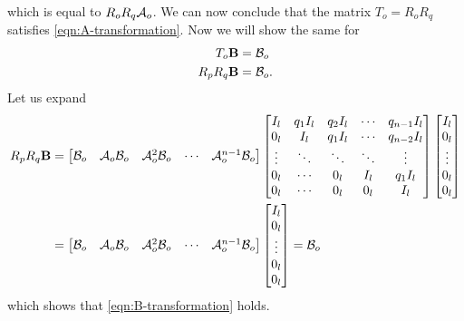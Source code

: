 \begin{appendices}
\begin{equation*}
\end{equation*}
which is equal to $R_oR_q\mathcal{A}_o$. We can now conclude that the matrix $T_o=R_oR_q$ satisfies \eqref{eqn:A-transformation}. Now we will show the same for
\begin{equation}\label{eqn:B-transformation}
    \begin{split}
        T_o\mathbf{B} &= \mathcal{B}_o \\
        R_pR_q\mathbf{B} &= \mathcal{B}_o.
    \end{split}
\end{equation}
Let us expand
\begin{equation*}
    \begin{split}
        R_pR_q\mathbf{B} &=
        \begin{bmatrix}
            \mathcal{B}_o & \mathcal{A}_o\mathcal{B}_o & \mathcal{A}^{2}_o\mathcal{B}_o & \cdots & \mathcal{A}^{n-1}_o\mathcal{B}_o \\
        \end{bmatrix}
        \begin{bmatrix}
            I_l & q_1I_l & q_2I_l & \cdots & q_{n-1}I_l \\
            0_l & I_l & q_1I_l & \cdots & q_{n-2}I_l \\
            \vdots & \ddots & \ddots & \ddots & \vdots \\
            0_l & \cdots & 0_l & I_l & q_1I_l \\
            0_l & \cdots & 0_l & 0_l & I_l \\
        \end{bmatrix}
        \begin{bmatrix}
            I_l \\ 0_l \\ \vdots \\ 0_l \\ 0_l \\
        \end{bmatrix} \\
        &=
        \begin{bmatrix}
            \mathcal{B}_o & \mathcal{A}_o\mathcal{B}_o & \mathcal{A}^{2}_o\mathcal{B}_o & \cdots & \mathcal{A}^{n-1}_o\mathcal{B}_o \\
        \end{bmatrix}
        \begin{bmatrix}
            I_l \\ 0_l \\ \vdots \\ 0_l \\ 0_l \\
        \end{bmatrix} = \mathcal{B}_o \\
    \end{split}
\end{equation*}
which shows that \eqref{eqn:B-transformation} holds.


\end{appendices}
